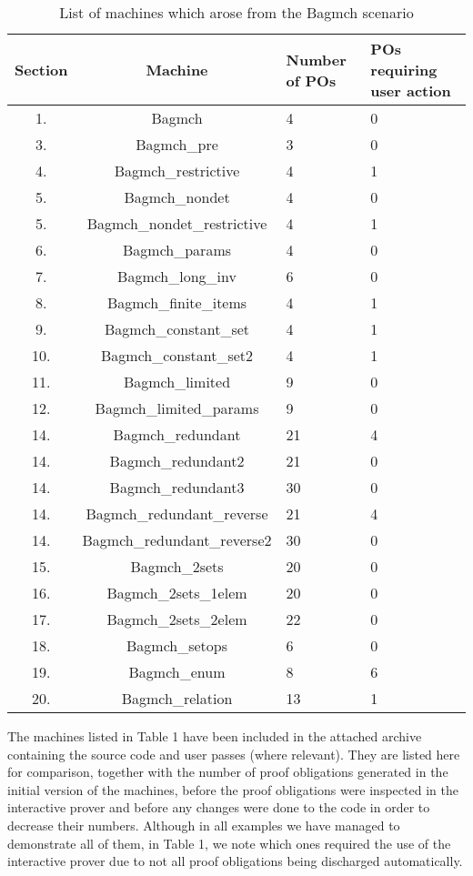 \documentclass[11pt,journal]{IEEEtran}
\begin{document}
	
\begin{table}[h]
	\centering
	\begin{tabular}
		{|c|c|m{1cm}|m{1.7cm}|}
		\hline
		Section & Machine & Number of POs & POs requiring user action  \\ 
		\hline 
		 1. & Bagmch & 4 & 0  \\ 
		 3. & Bagmch\_pre & 3 & 0 \\ 
		 4. & Bagmch\_restrictive & 4 & 1 \\ 
		 5. & Bagmch\_nondet & 4 & 0 \\ 
		 5. & Bagmch\_nondet\_restrictive & 4 & 1 \\ 
		 6. & Bagmch\_params & 4 & 0 \\ 
		 7. & Bagmch\_long\_inv & 6 & 0 \\ 
		 8. & Bagmch\_finite\_items & 4 & 1 \\ 
		 9. & Bagmch\_constant\_set & 4 & 1 \\
		10. & Bagmch\_constant\_set2 & 4 & 1 \\
		11. & Bagmch\_limited & 9 & 0 \\
		12. & Bagmch\_limited\_params & 9 & 0 \\
		14. & Bagmch\_redundant & 21 & 4 \\
		14. & Bagmch\_redundant2 & 21 & 0 \\
		14. & Bagmch\_redundant3 & 30 & 0 \\
		14. & Bagmch\_redundant\_reverse & 21 & 4 \\
		14. & Bagmch\_redundant\_reverse2 & 30 & 0 \\
		15. & Bagmch\_2sets & 20 & 0 \\
		16. & Bagmch\_2sets\_1elem & 20 & 0 \\
		17. & Bagmch\_2sets\_2elem & 22 & 0 \\
		18. & Bagmch\_setops & 6 & 0 \\
		19. & Bagmch\_enum & 8 & 6 \\
		20. & Bagmch\_relation & 13 & 1 \\
		\hline 

	\end{tabular}
			
	\caption{List of machines which arose from the Bagmch scenario}
\end{table}
	The machines listed in Table 1 have been included in the attached archive containing the source code and user passes (where relevant). They are listed here for comparison, together with the number of proof obligations generated in the initial version of the machines, before the proof obligations were inspected in the interactive prover and before any changes were done to the code in order to decrease their numbers. Although in all examples we have managed to demonstrate all of them, in Table 1, we note which ones required the use of the interactive prover due to not all proof obligations being discharged automatically.
	
\end{document}
